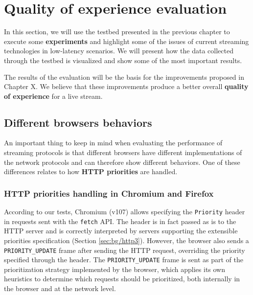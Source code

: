 \chapter{Quality of experience evaluation}
\label{cha:eval}

In this section, we will use the testbed presented in the previous chapter to execute some \textbf{experiments} and highlight some of the issues of current streaming technologies in low-latency scenarios. We will present how the data collected through the testbed is visualized and show some of the most important results.

The results of the evaluation will be the basis for the improvements proposed in Chapter X. We believe that these improvements produce a better overall \textbf{quality of experience} for a live stream.

\section{Different browsers behaviors}
\label{sec:eval/browsers}

An important thing to keep in mind when evaluating the performance of streaming protocols is that different browsers have different implementations of the network protocols and can therefore show different behaviors. One of these differences relates to how \textbf{HTTP priorities} are handled.

\subsection{HTTP priorities handling in Chromium and Firefox}
\label{sec:eval/browsers/priorities}

According to our tests, Chromium (v107) allows specifying the \texttt{Priority} header in requests sent with the \texttt{fetch} API. The header is in fact passed as is to the HTTP server and is correctly interpreted by servers supporting the extensible priorities specification (Section \ref{sec:bg/http3}). However, the browser also sends a \texttt{PRIORITY\_UPDATE} frame after sending the HTTP request, overriding the priority specified through the header. The \texttt{PRIORITY\_UPDATE} frame is sent as part of the prioritization strategy implemented by the browser, which applies its own heuristics to determine which requests should be prioritized, both internally in the browser and at the network level.

